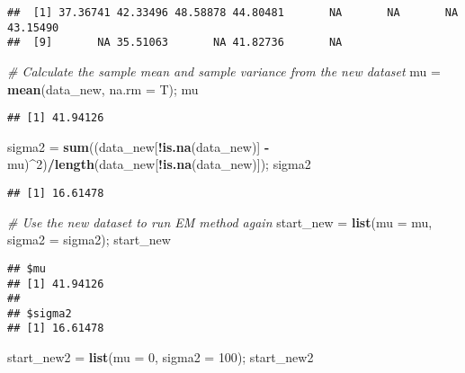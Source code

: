 \documentclass[]{article}
\newenvironment{Shaded}{\begin{snugshade}}{\end{snugshade}}
\newcommand{\CommentTok}[1]{\textcolor[rgb]{0.56,0.35,0.01}{\textit{#1}}}
\newcommand{\DataTypeTok}[1]{\textcolor[rgb]{0.13,0.29,0.53}{#1}}
\newcommand{\DecValTok}[1]{\textcolor[rgb]{0.00,0.00,0.81}{#1}}
\newcommand{\KeywordTok}[1]{\textcolor[rgb]{0.13,0.29,0.53}{\textbf{#1}}}
\newcommand{\NormalTok}[1]{#1}
\newcommand{\OperatorTok}[1]{\textcolor[rgb]{0.81,0.36,0.00}{\textbf{#1}}}
\newcommand{\StringTok}[1]{\textcolor[rgb]{0.31,0.60,0.02}{#1}}
\begin{document}
\begin{verbatim}
##  [1] 37.36741 42.33496 48.58878 44.80481       NA       NA       NA 43.15490
##  [9]       NA 35.51063       NA 41.82736       NA
\end{verbatim}

\begin{Shaded}
\begin{Highlighting}[]
\CommentTok{# Calculate the sample mean and sample variance from the new dataset}
\NormalTok{mu =}\StringTok{ }\KeywordTok{mean}\NormalTok{(data_new, }\DataTypeTok{na.rm =}\NormalTok{ T); mu}
\end{Highlighting}
\end{Shaded}

\begin{verbatim}
## [1] 41.94126
\end{verbatim}

\begin{Shaded}
\begin{Highlighting}[]
\NormalTok{sigma2 =}\StringTok{ }\KeywordTok{sum}\NormalTok{((data_new[}\OperatorTok{!}\KeywordTok{is.na}\NormalTok{(data_new)] }\OperatorTok{-}\StringTok{ }\NormalTok{mu)}\OperatorTok{^}\DecValTok{2}\NormalTok{)}\OperatorTok{/}\KeywordTok{length}\NormalTok{(data_new[}\OperatorTok{!}\KeywordTok{is.na}\NormalTok{(data_new)]); sigma2}
\end{Highlighting}
\end{Shaded}

\begin{verbatim}
## [1] 16.61478
\end{verbatim}

\begin{Shaded}
\begin{Highlighting}[]
\CommentTok{# Use the new dataset to run EM method again}
\NormalTok{start_new =}\StringTok{ }\KeywordTok{list}\NormalTok{(}\DataTypeTok{mu =}\NormalTok{ mu, }\DataTypeTok{sigma2 =}\NormalTok{ sigma2); start_new}
\end{Highlighting}
\end{Shaded}

\begin{verbatim}
## $mu
## [1] 41.94126
## 
## $sigma2
## [1] 16.61478
\end{verbatim}

\begin{Shaded}
\begin{Highlighting}[]
\NormalTok{start_new2 =}\StringTok{ }\KeywordTok{list}\NormalTok{(}\DataTypeTok{mu =} \DecValTok{0}\NormalTok{, }\DataTypeTok{sigma2 =} \DecValTok{100}\NormalTok{); start_new2}
\end{Highlighting}
\end{Shaded}
\end{document}
